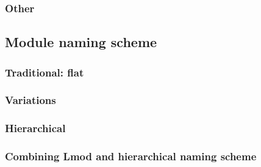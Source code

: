\subsubsection{Other}

\subsection{Module naming scheme}

\subsubsection{Traditional: flat}

\subsubsection{Variations}


\subsubsection{Hierarchical}

\subsubsection{Combining Lmod and hierarchical naming scheme}
